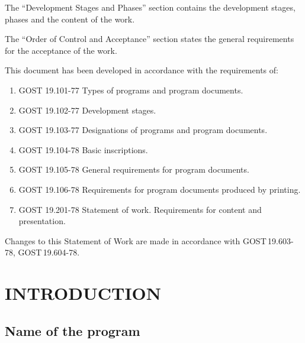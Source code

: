 \documentclass[12pt,a4paper]{extarticle}
\begin{document}
The \enquote{Development Stages and Phases} section contains the development stages, phases and the content of the work.

The \enquote{Order of Control and Acceptance} section states the general requirements for the acceptance of the work.

\clearpage

\noindent
This document has been developed in accordance with the requirements of:

\begin{enumerate}[label=\arabic*), leftmargin=1.25cm]
\item GOST 19.101-77 Types of programs and program documents\cite{gost19101}.
\item GOST 19.102-77 Development stages\cite{gost19102}.
\item GOST 19.103-77 Designations of programs and program documents\cite{gost19103}.
\item GOST 19.104-78 Basic inscriptions\cite{gost19104}.
\item GOST 19.105-78 General requirements for program documents\cite{gost19105}.
\item GOST 19.106-78 Requirements for program documents produced by printing\cite{gost19106}.
\item GOST 19.201-78 Statement of work. Requirements for content and presentation\cite{gost19201}.
\end{enumerate}

Changes to this Statement of Work are made in accordance with GOST\,19.603-78\cite{gost19603}, GOST\,19.604-78\cite{gost19604}.

\clearpage

\hypersetup{linkcolor=black}
\tableofcontents
\hypersetup{linkcolor=blue}
\thispagestyle{fancy}
\clearpage

\section{INTRODUCTION}

\subsection{Name of the program}
\end{document}
